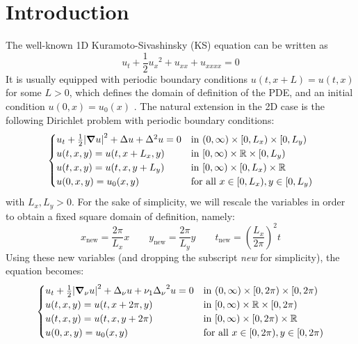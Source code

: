\documentclass[twoside]{article}
\begin{document}
\section{Introduction}\label{sec:intro}
The well-known 1D Kuramoto-Sivashinsky (KS) equation can be written as
\begin{equation}
  u_t + \frac{1}{2} {u_x}^2 + u_{xx} + u_{xxxx} = 0
\end{equation}
It is usually equipped with periodic boundary conditions $u(t, x + L) = u(t, x)$ for some $L > 0$, which defines the domain of definition of the PDE, and an initial condition $u(0, x) = u_0(x)$ \cite{1d-ks}. The natural extension in the 2D case is the following Dirichlet problem with periodic boundary conditions:
\begin{equation}\label{eq:2d_ks_0}
  \begin{cases}
    u_t + \frac{1}{2} \abs{\grad u}^2 + \Delta u + \Delta^2 u = 0 & \text{in } (0, \infty) \times [0, L_x) \times [0, L_y) \\
    u(t, x, y) = u(t, x + L_x, y)                                         & \text{in } [0, \infty) \times \mathbb{R} \times [0, L_y)      \\
    u(t, x, y) = u(t, x, y + L_y)                                         & \text{in } [0, \infty) \times [0, L_x) \times \mathbb{R}      \\
    u(0, x, y) = u_0(x, y)                                                & \text{for all } x \in [0, L_x), y \in [0, L_y)
  \end{cases}
\end{equation}
with $L_x, L_y > 0$. For the sake of simplicity, we will rescale the variables in order to obtain a fixed square domain of definition, namely:
\begin{equation}
  x_\mathrm{new} = \frac{2\pi}{L_x} x \qquad y_\mathrm{new} = \frac{2\pi}{L_y} y \qquad t_\mathrm{new} = {\left(\frac{L_x}{2 \pi}\right)}^2 t
\end{equation}
Using these new variables (and dropping the subscript \emph{new} for simplicity), the equation becomes:
\begin{equation}\label{eq:2d_ks}
  \begin{cases}
    u_t + \frac{1}{2} \abs{\grad_\nu u}^2 + \Delta_\nu u + \nu_1{\Delta_\nu}^2 u = 0 & \text{in } (0, \infty) \times [0, 2\pi) \times [0, 2\pi) \\
    u(t, x, y) = u(t, x + 2\pi, y)                                                           & \text{in } [0, \infty) \times \mathbb{R} \times [0, 2\pi)       \\
    u(t, x, y) = u(t, x, y + 2\pi)                                                           & \text{in } [0, \infty) \times [0, 2\pi) \times \mathbb{R}       \\
    u(0, x, y) = u_0(x, y)                                                                   & \text{for all } x \in [0, 2\pi), y \in [0, 2\pi)
  \end{cases}
\end{equation}
\end{document}
